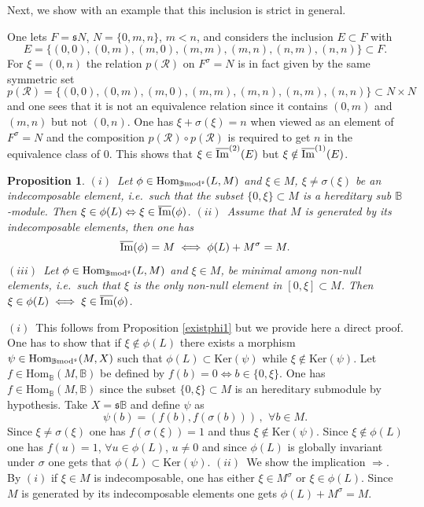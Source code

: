 \documentclass[12pt]{article}
\newtheorem{prop}[thm]{Proposition}
\def\Hom{{\rm Hom}}
\def\B{{\mathbb B}}
\def\imm{\overline{\rm Im}}
\def\cR{{\mathcal R}}
\def\qqq{\,,\,~\forall}
\newcommand{\ie}{{\it i.e.\/}\ }
\def\ker{{\mbox{Ker}}}
\def\Hom {{\mbox{Hom}}}
\def\yb{\mathfrak{s}}
\def\b2{{\rm \B mod^{\mathfrak s}}}
\begin{document}
Next, we show with an example that this inclusion is strict in general. \vspace{.05in}

One lets $F=\yb N$, $N=\{0,m,n\}$, $m<n$, and considers the inclusion $E\subset F$ with
 $$
E=\{ (0, 0), (0, m), (m, 0), (m, m), (m, n), (n, m), (n, n)\}\subset F.
$$
For $\xi=(0,n)$ the relation $p(\cR)$ on $F^\sigma=N$ is in fact given by the same symmetric set 
$$
p(\cR)=\{ (0, 0), (0, m), (m, 0), (m, m), (m, n), (n, m), (n, n)\}\subset N\times N
$$
and one sees that it is not an equivalence relation since it contains $(0, m)$ and $(m, n)$ but not $(0, n)$. One has $\xi+\sigma(\xi)=n$ when viewed as an element of $F^\sigma=N$ and the composition $p(\cR)\circ p(\cR)$ is required to get $n$ in the equivalence class of $0$. This shows that $\xi \in \imm^{(2)}(E)$ but $\xi \notin \imm^{(1)}(E)$.
\begin{prop}\label{extreme and range}$(i)$~Let $\phi\in \Hom_\b2(L,M)$ and $\xi\in M$, $\xi \neq \sigma(\xi)$ be an indecomposable element, \ie such that the subset $\{0,\xi\}\subset M$ is a hereditary sub $\B$-module. Then $\xi\in \phi(L)\Leftrightarrow \xi\in \imm(\phi)$. \newline
 $(ii)$~Assume that $M$ is generated by its indecomposable elements, then one has
 \begin{equation}\label{nice image}
 	\imm(\phi)=M\iff \phi(L)+M^\sigma=M.
 \end{equation}	
 $(iii)$~Let $\phi\in \Hom_\b2(L,M)$ and $\xi\in M$,  be  minimal among non-null elements, \ie such that $\xi$ is the only non-null element in  $[0,\xi]\subset M$. Then $\xi\in \phi(L)\iff \xi\in \imm(\phi)$. 
 \end{prop}
\proof $(i)$~This follows from Proposition \ref{existphi1} but we provide here a direct proof. One has to show that if $\xi\notin \phi(L)$  there exists a morphism $\psi\in \Hom_\b2(M,X)$ such that $\phi(L)\subset \ker(\psi)$ while $\xi\notin \ker(\psi)$. Let $f\in \Hom_\B(M,\B)$ be defined by  $f(b)=0\iff b\in \{0,\xi\}$. One has $f\in \Hom_\B(M,\B)$ since the subset $\{0,\xi\}\subset M$ is an hereditary submodule by hypothesis. Take $X=\yb\B$ and define $\psi$ as 
$$
\psi(b)=(f(b),f(\sigma(b)))\qqq b\in M.
$$
Since $\xi \neq \sigma(\xi)$ one has $f(\sigma(\xi))=1$ and thus $\xi\notin \ker(\psi)$. Since $\xi \notin \phi(L)$ one has $f(u)=1$, $\forall u\in \phi(L)$, $u\neq 0$ and since $\phi(L)$ is globally invariant under $\sigma$ one gets that $\phi(L)\subset \ker(\psi)$.\newline
 $(ii)$~We show the implication $\Rightarrow$. By $(i)$ if $\xi\in M$ is indecomposable, one has either $\xi\in M^\sigma$ or $\xi\in \phi(L)$.  Since $M$ is generated by its indecomposable elements one gets $\phi(L)+M^\sigma=M$.\newline
\end{document}
